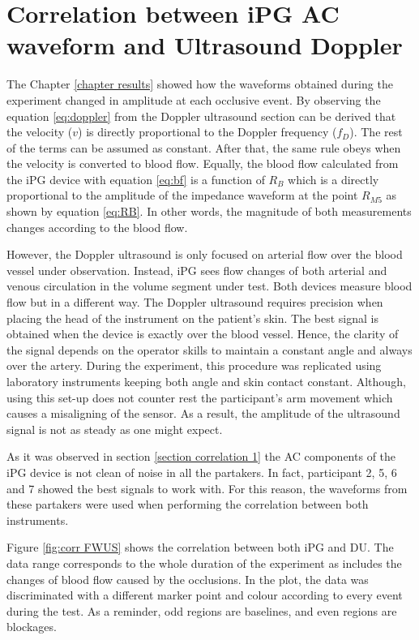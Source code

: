 \section{Correlation between iPG AC waveform and Ultrasound Doppler} %
\label{section correlation 2} 
The Chapter  \ref{chapter results} showed how the waveforms obtained during the experiment changed in amplitude at each occlusive event. By observing the equation \ref{eq:doppler}  from the Doppler ultrasound section can be derived that the velocity ($v$) is directly proportional to the Doppler frequency ($f_D$). The rest of the terms can be assumed as constant. After that, the same rule obeys when the velocity is converted to blood flow. Equally, the blood flow calculated from the iPG device with equation \ref{eq:bf} is a function of $R_B$ which is a directly proportional to the amplitude of the impedance waveform at the point $R_{M5}$ as shown by equation \ref{eq:RB}. In other words, the magnitude of both measurements changes according to the blood flow.

However, the Doppler ultrasound is only focused on arterial flow over the blood vessel under observation. Instead, iPG sees flow changes of both arterial and venous circulation in the volume segment under test. Both devices measure blood flow but in a different way. The Doppler ultrasound requires precision when placing the head of the instrument on the patient's skin. The best signal is obtained when the device is exactly over the blood vessel. Hence, the clarity of the signal depends on the operator skills to maintain a constant angle and always over the artery. During the experiment, this procedure was replicated using laboratory instruments keeping both angle and skin contact constant. Although, using this set-up does not counter rest the participant's arm movement which causes a misaligning of the sensor. As a result, the amplitude of the ultrasound signal is not as steady as one might expect. 

As it was observed in section \ref{section correlation 1} the AC components of the iPG device is not clean of noise in all the partakers. In fact, participant 2, 5, 6 and 7 showed the best signals to work with. For this reason, the waveforms from these partakers were used when performing the correlation between both instruments. 

Figure \ref{fig:corr FWUS} shows the correlation between both iPG and DU. The data range corresponds to the whole duration of the experiment as includes the changes of blood flow caused by the occlusions. In the plot, the data was discriminated with a different marker point and colour according to every event during the test. As a reminder, odd regions are baselines, and even regions are blockages.  

